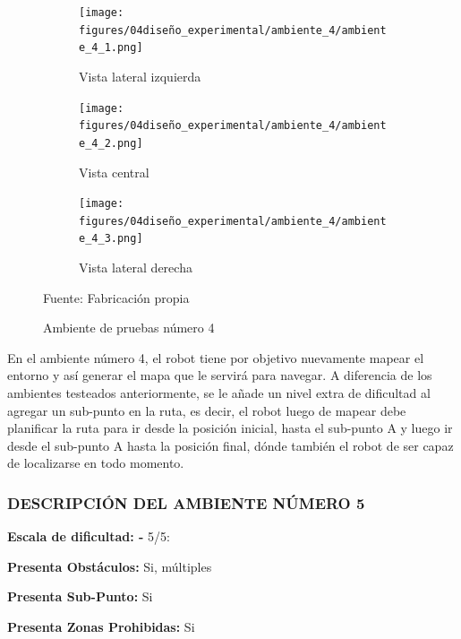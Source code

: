 \begin{figure}[H]
    \centering
    \begin{subfigure}[b]{0.30\textwidth}
    \texttt{[image: figures/04diseño\_experimental/ambiente\_4/ambiente\_4\_1.png]}
    \caption{Vista lateral izquierda}
    \label{fig:ambiente_4_1}
    \end{subfigure}
    \begin{subfigure}[b]{0.30\textwidth}
    \texttt{[image: figures/04diseño\_experimental/ambiente\_4/ambiente\_4\_2.png]}
    \caption{Vista central}
    \label{fig:ambiente_4_2}
    \end{subfigure}
    \begin{subfigure}[b]{0.30\textwidth}
    \texttt{[image: figures/04diseño\_experimental/ambiente\_4/ambiente\_4\_3.png]}
    \caption{Vista lateral derecha}
    \label{fig:ambiente_4_3}
    \end{subfigure}
    \caption{Ambiente de pruebas número 4 }
    Fuente: Fabricación propia
    \label{fig:ambiente_4}
\end{figure}

En el ambiente número 4, el robot tiene por objetivo nuevamente mapear el entorno y así generar el mapa que le servirá para navegar. A diferencia de los ambientes testeados anteriormente, se le añade un nivel extra de dificultad al agregar un sub-punto en la ruta, es decir, el robot luego de mapear debe planificar la ruta para ir desde la posición inicial, hasta el sub-punto A y luego ir desde el sub-punto A hasta la posición final, dónde también el robot de ser capaz de localizarse en todo momento.

\subsubsection{DESCRIPCIÓN DEL AMBIENTE NÚMERO 5}
\textbf{Escala de dificultad: -} 5/5:

\hspace{5mm}  \textbf{Presenta Obstáculos:} Si, múltiples

\hspace{5mm}  \textbf{Presenta Sub-Punto:} Si

\hspace{5mm}  \textbf{Presenta Zonas Prohibidas:} Si

